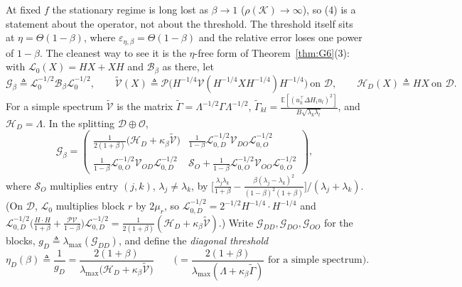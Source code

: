 \documentclass[11pt]{article}
\theoremstyle{remark}
\newcommand{\E}{\mathbb{E}}
\begin{document}
At fixed $f$ the stationary regime is long lost as $\beta\to1$ ($\rho(\mathcal K)\to\infty$), so (4) is a statement about the operator, not about the threshold. The threshold itself sits at $\eta=\Theta(1-\beta)$, where $\varepsilon_{\eta,\beta}=\Theta(1-\beta)$ and the relative error loses one power of $1-\beta$. The cleanest way to see it is the $\eta$-free form of Theorem~\ref{thm:G6}(3): with $\mathcal L_0(X)=HX+XH$ and $\mathcal B_\beta$ as there, let
\[
\mathcal G_\beta\triangleq\mathcal L_0^{-1/2}\mathcal B_\beta\mathcal L_0^{-1/2},\qquad
\widetilde{\mathcal V}(X)\triangleq\mathcal P\big(H^{-1/4}\mathcal V(H^{-1/4}XH^{-1/4})H^{-1/4}\big)\ \text{on }\mathcal D,\qquad
\mathcal H_D(X)\triangleq HX\ \text{on }\mathcal D .
\]
For a simple spectrum $\widetilde{\mathcal V}$ is the matrix $\widetilde\Gamma=\Lambda^{-1/2}\Gamma\Lambda^{-1/2}$, $\widetilde\Gamma_{kl}=\frac{\E[(u_k^\top\Delta H_iu_l)^2]}{B\sqrt{\lambda_k\lambda_l}}$, and $\mathcal H_D=\Lambda$. In the splitting $\mathcal D\oplus\mathcal O$,
\begin{equation}\label{eq:diag-G}
\mathcal G_\beta=\begin{pmatrix}\frac1{2(1+\beta)}\big(\mathcal H_D+\kappa_\beta\widetilde{\mathcal V}\big)&\frac1{1-\beta}\mathcal L_{0,D}^{-1/2}\mathcal V_{DO}\mathcal L_{0,O}^{-1/2}\\[2pt]
\frac1{1-\beta}\mathcal L_{0,O}^{-1/2}\mathcal V_{OD}\mathcal L_{0,D}^{-1/2}&\mathcal S_O+\frac1{1-\beta}\mathcal L_{0,O}^{-1/2}\mathcal V_{OO}\mathcal L_{0,O}^{-1/2}\end{pmatrix},
\end{equation}
where $\mathcal S_O$ multiplies entry $(j,k)$, $\lambda_j\ne\lambda_k$, by $\big[\frac{\lambda_j\lambda_k}{1+\beta}-\frac{\beta(\lambda_j-\lambda_k)^2}{(1-\beta)^2(1+\beta)}\big]/(\lambda_j+\lambda_k)$. (On $\mathcal D$, $\mathcal L_0$ multiplies block $r$ by $2\mu_r$, so $\mathcal L_{0,D}^{-1/2}=2^{-1/2}H^{-1/4}\cdot H^{-1/4}$ and $\mathcal L_{0,D}^{-1/2}\big(\frac{H\cdot H}{1+\beta}+\frac{\mathcal P\mathcal V}{1-\beta}\big)\mathcal L_{0,D}^{-1/2}=\frac{1}{2(1+\beta)}(\mathcal H_D+\kappa_\beta\widetilde{\mathcal V})$.) Write $\mathcal G_{DD},\mathcal G_{DO},\mathcal G_{OO}$ for the blocks, $g_D\triangleq\lambda_{\max}(\mathcal G_{DD})$, and define the \emph{diagonal threshold}
\begin{equation}\label{eq:diag-etaD}
\eta_D(\beta)\triangleq\frac1{g_D}=\frac{2(1+\beta)}{\lambda_{\max}\big(\mathcal H_D+\kappa_\beta\widetilde{\mathcal V}\big)}\qquad\Big(=\frac{2(1+\beta)}{\lambda_{\max}(\Lambda+\kappa_\beta\widetilde\Gamma)}\text{ for a simple spectrum}\Big).
\end{equation}
\end{document}
